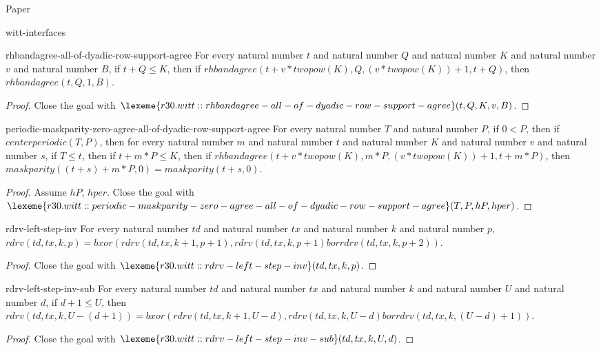 \begin{lexlean}{Paper}
\begin{section}{witt-interfaces}
  \begin{theorem}{rhbandagree-all-of-dyadic-row-support-agree}
  For every natural number \(t\) and natural number \(Q\) and natural number \(K\) and natural number \(v\) and natural number \(B\), if \(t + Q ≤ K\), then if \(rhbandagree(t + v * twopow(K), Q, (v * twopow(K)) + 1, t + Q)\), then \(rhbandagree(t, Q, 1, B)\).
  \begin{proof}
  Close the goal with \(\lexeme{r30.witt::rhbandagree-all-of-dyadic-row-support-agree}(t, Q, K, v, B)\).
  \end{proof}
  \end{theorem}

  \begin{theorem}{periodic-maskparity-zero-agree-all-of-dyadic-row-support-agree}
  For every natural number \(T\) and natural number \(P\), if \(0 < P\), then if \(centerperiodic(T, P)\), then for every natural number \(m\) and natural number \(t\) and natural number \(K\) and natural number \(v\) and natural number \(s\), if \(T ≤ t\), then if \(t + m * P ≤ K\), then if \(rhbandagree(t + v * twopow(K), m * P, (v * twopow(K)) + 1, t + m * P)\), then \(maskparity((t + s) + m * P, 0) = maskparity(t + s, 0)\).
  \begin{proof}
  Assume \(hP\), \(hper\).
  Close the goal with \(\lexeme{r30.witt::periodic-maskparity-zero-agree-all-of-dyadic-row-support-agree}(T, P, hP, hper)\).
  \end{proof}
  \end{theorem}

  \begin{theorem}{rdrv-left-step-inv}
  For every natural number \(td\) and natural number \(tx\) and natural number \(k\) and natural number \(p\), \(rdrv(td, tx, k, p) = bxor(rdrv(td, tx, k + 1, p + 1), rdrv(td, tx, k, p + 1) bor rdrv(td, tx, k, p + 2))\).
  \begin{proof}
  Close the goal with \(\lexeme{r30.witt::rdrv-left-step-inv}(td, tx, k, p)\).
  \end{proof}
  \end{theorem}

  \begin{theorem}{rdrv-left-step-inv-sub}
  For every natural number \(td\) and natural number \(tx\) and natural number \(k\) and natural number \(U\) and natural number \(d\), if \(d + 1 ≤ U\), then \(rdrv(td, tx, k, U - (d + 1)) = bxor(rdrv(td, tx, k + 1, U - d), rdrv(td, tx, k, U - d) bor rdrv(td, tx, k, (U - d) + 1))\).
  \begin{proof}
  Close the goal with \(\lexeme{r30.witt::rdrv-left-step-inv-sub}(td, tx, k, U, d)\).
  \end{proof}
  \end{theorem}


\end{section}
\end{lexlean}

